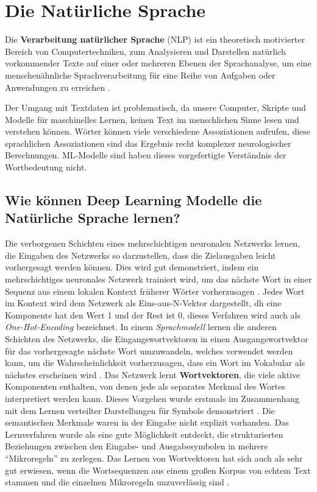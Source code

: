 \chapter{Die Natürliche Sprache}


Die \textbf{Verarbeitung natürlicher Sprache} (NLP) ist ein theoretisch motivierter Bereich von Computertechniken, zum Analysieren und Darstellen natürlich vorkommender Texte auf einer oder mehreren Ebenen der Sprachanalyse, um eine menschenähnliche Sprachverarbeitung für eine Reihe von Aufgaben oder Anwendungen zu erreichen \cite*{Liddy}.

Der Umgang mit Textdaten ist problematisch, da unsere Computer, Skripte und Modelle für maschinelles Lernen, keinen Text im menschlichen Sinne lesen und verstehen können. Wörter können viele verschiedene Assoziationen aufrufen, diese sprachlichen Assoziationen sind das Ergebnis recht komplexer neurologischer Berechnungen. ML-Modelle sind haben dieses vorgefertigte Verständnis der Wortbedeutung nicht.



\section{Wie können Deep Learning Modelle die Natürliche Sprache lernen?}

Die verborgenen Schichten eines mehrschichtigen neuronalen Netzwerks lernen, die Eingaben des Netzwerks so darzustellen, dass die Zielausgaben leicht vorhergesagt werden können. Dies wird gut demonstriert, indem ein mehrschichtiges neuronales Netzwerk trainiert wird, um das nächste Wort in einer Sequenz aus einem lokalen Kontext früherer Wörter vorherzusagen \cite*{Bengio2003}. Jedes Wort im Kontext wird dem Netzwerk als Eins-aus-N-Vektor dargestellt, dh eine Komponente hat den Wert 1 und der Rest ist 0, dieses Verfahren wird auch als \textit{One-Hot-Encoding} bezeichnet. In einem \textit{Sprachmodell} lernen die anderen Schichten des Netzwerks, die Eingangswortvektoren in einen Ausgangswortvektor für das vorhergesagte nächste Wort umzuwandeln, welches verwendet werden kann, um die Wahrscheinlichkeit vorherzusagen, dass ein Wort im Vokabular als nächstes erscheinen wird \cite*{Lecun2015}. Das Netzwerk lernt \textbf{Wortvektoren}, die viele aktive Komponenten enthalten, von denen jede als separates Merkmal des Wortes interpretiert werden kann. Dieses Vorgehen wurde erstmals im Zusammenhang mit dem Lernen verteilter Darstellungen für Symbole demonstriert \cite*{Rumelhart1986}. Die semantischen Merkmale waren in der Eingabe nicht explizit vorhanden. Das Lernverfahren wurde als eine gute Möglichkeit entdeckt, die strukturierten Beziehungen zwischen den Eingabe- und Ausgabesymbolen in mehrere \enquote{Mikroregeln} zu zerlegen. Das Lernen von Wortvektoren hat sich auch als sehr gut erwiesen, wenn die Wortsequenzen aus einem großen Korpus von echtem Text stammen und die einzelnen Mikroregeln unzuverlässig sind \cite*{Bengio2003}.


